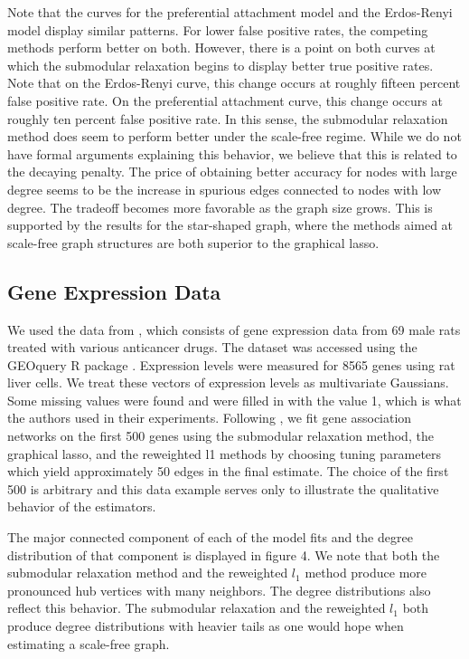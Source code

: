 \documentclass{uwstat572}
\theoremstyle{remark}
\theoremstyle{definition}
\begin{document}
Note that the curves for the preferential attachment model and the Erdos-Renyi model display similar patterns.  For lower false positive rates, the competing methods perform better on both.  However, there is a point on both curves at which the submodular relaxation begins to display better true positive rates.  Note that on the Erdos-Renyi curve, this change occurs at roughly fifteen percent false positive rate.  On the preferential attachment curve, this change occurs at roughly ten percent false positive rate.  In this sense, the submodular relaxation method does seem to perform better under the scale-free regime.  While we do not have formal arguments explaining this behavior, we believe that this is related to the decaying penalty.  The price of obtaining better accuracy for nodes with large degree seems to be the increase in spurious edges connected to nodes with low degree.  The tradeoff becomes more favorable as the graph size grows.  This is supported by the results for the star-shaped graph, where the methods aimed at scale-free graph structures are both superior to the graphical lasso.  





\subsection{Gene Expression Data}

We used the data from \cite{ganter05}, which consists of gene expression data from 69 male rats treated with various anticancer drugs.  The dataset was accessed using the GEOquery R package \citep{geoquery}.  Expression levels were measured for 8565 genes using rat liver cells.  We treat these vectors of expression levels as multivariate Gaussians.  Some missing values were found and were filled in with the value 1, which is what the authors used in their experiments.  Following \cite{Defazio2012}, we fit gene association networks on the first 500 genes using the submodular relaxation method, the graphical lasso, and the reweighted l1 methods by choosing tuning parameters which yield approximately 50 edges in the final estimate.  The choice of the first 500 is arbitrary and this data example serves only to illustrate the qualitative behavior of the estimators.  

The major connected component of each of the model fits and the degree distribution of that component is displayed in figure 4.  We note that both the submodular relaxation method and the reweighted $l_1$ method produce more pronounced hub vertices with many neighbors.  The degree distributions also reflect this behavior.  The submodular relaxation and the reweighted $l_1$ both produce degree distributions with heavier tails as one would hope when estimating a scale-free graph.
\end{document}
